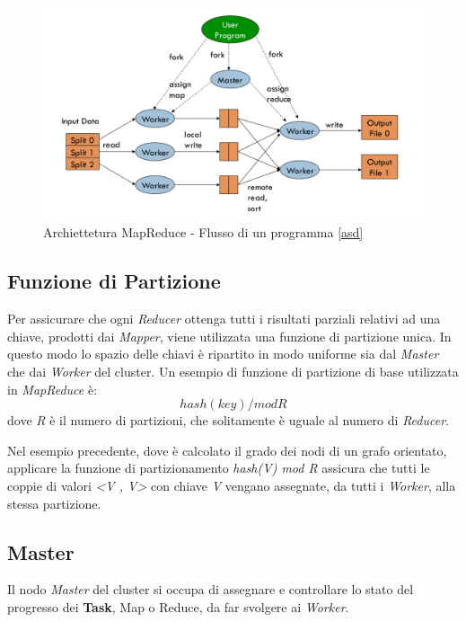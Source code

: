 \documentclass[LaM,binding=0.6cm]{sapthesis}
\begin{document}
\begin{figure}
\centering
\includegraphics[width=1\textwidth]{esempio_architettura} 
\caption{Archiettetura MapReduce - Flusso di un programma \ref{asd}}%
\label{fig:strutMR}
\end{figure}


\subsection{Funzione di Partizione}

Per assicurare che ogni \textit{Reducer} ottenga tutti i risultati parziali relativi ad una chiave, prodotti dai \textit{Mapper}, viene utilizzata una funzione di partizione unica. In questo modo lo spazio delle chiavi è ripartito in modo uniforme sia dal \textit{Master} che dai \textit{Worker} del cluster.
Un esempio di funzione di partizione di base utilizzata in \textit{MapReduce} \cite{Dean:2008:MSD:1327452.1327492} è:
\begin{equation*}
	hash(key) / mod R 
\end{equation*}
dove \textit{R} è il numero di partizioni, che solitamente è uguale al numero di \textit{Reducer}.

Nel esempio precedente, dove è calcolato il grado dei nodi di un grafo orientato, applicare la funzione di partizionamento \textit{hash(V) mod R} assicura che tutti le coppie di valori \textit{<V , V>} con chiave \textit{V} vengano assegnate, da tutti i \textit{Worker}, alla stessa partizione.

\subsection{Master}

Il nodo \textit{Master} del cluster si occupa di assegnare e controllare lo stato del progresso dei \textbf{Task}, Map o Reduce, da far svolgere ai \textit{Worker}.
\end{document}
